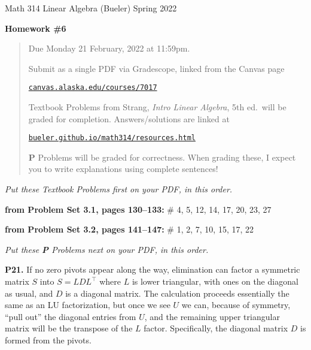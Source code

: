 \documentclass[12pt]{amsart}
\newcommand{\prob}[1]{\bigskip\noindent\textbf{#1.}\quad }
\newcommand{\probset}[2]{\bigskip\noindent\textbf{from Problem Set #1, pages #2:}\quad }
\begin{document}
\scriptsize \noindent Math 314 Linear Algebra (Bueler) \hfill Spring 2022
\normalsize\medskip

\Large
\centerline{\textbf{Homework \#6}}

\normalsize
\bigskip
\begin{quote}
Due Monday 21 February, 2022 at 11:59pm.

\medskip
\noindent Submit as a single PDF via Gradescope, linked from the Canvas page

\href{https://canvas.alaska.edu/courses/7017}{\texttt{canvas.alaska.edu/courses/7017}}

\noindent Textbook Problems from Strang, \emph{Intro Linear Algebra}, 5th ed.~will be graded for completion.  Answers/solutions are linked at

\href{https://bueler.github.io/math314/resources.html}{\texttt{bueler.github.io/math314/resources.html}}

\noindent \textbf{P} Problems will be graded for correctness.  When grading these, I expect you to write explanations using complete sentences!
\end{quote}
\medskip

\thispagestyle{empty}

\noindent \hrulefill

\noindent \emph{Put these Textbook Problems first on your PDF, in this order.}

\probset{3.1}{130--133} \# 4, 5, 12, 14, 17, 20, 23, 27

\probset{3.2}{141--147} \# 1, 2, 7, 10, 15, 17, 22


\bigskip
\noindent \hrulefill

\noindent \emph{Put these \textbf{P} Problems next on your PDF, in this order.}

\prob{P21}  If no zero pivots appear along the way, elimination can factor a symmetric matrix $S$ into $S=L D L^\top$ where $L$ is lower triangular, with ones on the diagonal as usual, and $D$ is a diagonal matrix.  The calculation proceeds essentially the same as an LU factorization, but once we see $U$ we can, because of symmetry, ``pull out'' the diagonal entries from $U$, and the remaining upper triangular matrix will be the transpose of the $L$ factor.  Specifically, the diagonal matrix $D$ is formed from the pivots.
\end{document}
